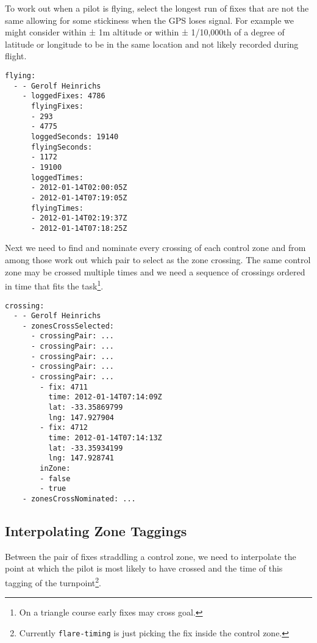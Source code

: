 \documentclass[gap.tex]{subfiles}
\begin{document}
To work out when a pilot is flying, select the longest run of fixes that are
not the same allowing for some stickiness when the GPS loses signal. For
example we might consider within ± 1m altitude or within ± 1/10,000th of
a degree of latitude or longitude to be in the same location and not likely
recorded during flight.

\begin{lstlisting}[caption={Which fixes are considered flown, \texttt{flying} nodes of \texttt{*.cross-zone.yaml}.}]
flying:
  - - Gerolf Heinrichs
    - loggedFixes: 4786
      flyingFixes:
      - 293
      - 4775
      loggedSeconds: 19140
      flyingSeconds:
      - 1172
      - 19100
      loggedTimes:
      - 2012-01-14T02:00:05Z
      - 2012-01-14T07:19:05Z
      flyingTimes:
      - 2012-01-14T02:19:37Z
      - 2012-01-14T07:18:25Z
\end{lstlisting}

Next we need to find and nominate every crossing of each control zone and from
among those work out which pair to select as the zone crossing. The same
control zone may be crossed multiple times and we need a sequence of crossings
ordered in time that fits the task\footnote{On a triangle course early fixes
may cross goal.}.

\begin{lstlisting}[caption={Selected crossings, one for each zone, \texttt{crossing} nodes of \texttt{*.cross-zone.yaml}.}]
crossing:
  - - Gerolf Heinrichs
    - zonesCrossSelected:
      - crossingPair: ...
      - crossingPair: ...
      - crossingPair: ...
      - crossingPair: ...
      - crossingPair: ...
        - fix: 4711
          time: 2012-01-14T07:14:09Z
          lat: -33.35869799
          lng: 147.927904
        - fix: 4712
          time: 2012-01-14T07:14:13Z
          lat: -33.35934199
          lng: 147.928741
        inZone:
        - false
        - true
    - zonesCrossNominated: ...
\end{lstlisting}

\newpage
\subsection{Interpolating Zone Taggings}

Between the pair of fixes straddling a control zone, we need to interpolate the
point at which the pilot is most likely to have crossed and the time of this
tagging of the turnpoint\footnote{Currently \texttt{flare-timing} is just
picking the fix inside the control zone.}.
\end{document}
